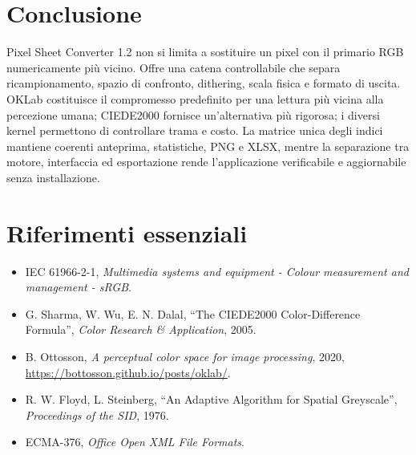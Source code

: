 \documentclass[11pt,a4paper]{article}
\begin{document}
\section{Conclusione}
Pixel Sheet Converter 1.2 non si limita a sostituire un pixel con il primario RGB numericamente più vicino. Offre una catena controllabile che separa ricampionamento, spazio di confronto, dithering, scala fisica e formato di uscita. OKLab costituisce il compromesso predefinito per una lettura più vicina alla percezione umana; CIEDE2000 fornisce un'alternativa più rigorosa; i diversi kernel permettono di controllare trama e costo. La matrice unica degli indici mantiene coerenti anteprima, statistiche, PNG e XLSX, mentre la separazione tra motore, interfaccia ed esportazione rende l'applicazione verificabile e aggiornabile senza installazione.

\section*{Riferimenti essenziali}
\begin{itemize}[leftmargin=*]
\item IEC 61966-2-1, \emph{Multimedia systems and equipment - Colour measurement and management - sRGB}.
\item G. Sharma, W. Wu, E. N. Dalal, ``The CIEDE2000 Color-Difference Formula'', \emph{Color Research \& Application}, 2005.
\item B. Ottosson, \emph{A perceptual color space for image processing}, 2020, \url{https://bottosson.github.io/posts/oklab/}.
\item R. W. Floyd, L. Steinberg, ``An Adaptive Algorithm for Spatial Greyscale'', \emph{Proceedings of the SID}, 1976.
\item ECMA-376, \emph{Office Open XML File Formats}.
\end{itemize}
\end{document}
